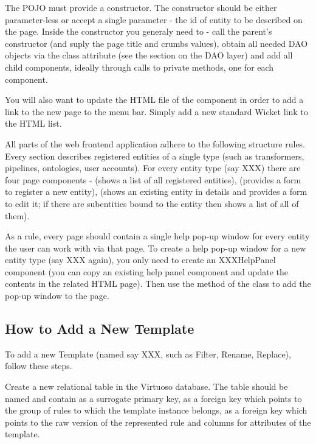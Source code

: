 \begin{description}[style=nextline,font=\ttfamily]
The POJO must provide a constructor. The constructor should be either parameter-less or accept a single parameter - the id of entity to be described on the page. Inside the constructor you generaly need to - call the parent's constructor (and suply the page title and crumbs values), obtain all needed DAO objects via the  class attribute (see the section on the DAO layer) and add all child components, ideally through calls to private methods, one for each component.

You will also want to update the HTML file of the  component in order to add a link to the new page to the menu bar. Simply add a new standard Wicket link to the HTML list.

All parts of the web frontend application adhere to the following structure rules. Every section describes registered entities of a single type (such as transformers, pipelines, ontologies, user accounts). For every entity type (say XXX) there are four page components -  (shows a list of all registered entities),  (provides a form to register a new entity),  (shows an existing entity in details and provides a form to edit it; if there are subentities bound to the entity then shows a list of all of them).

As a rule, every page should contain a single help pop-up window for every entity the user can work with via that page. To create a help pop-up window for a new entity type (say XXX again), you only need to create an XXXHelpPanel component (you can copy an existing help panel component and update the contents in the related HTML page). Then use the  method of the  class to add the pop-up window to the page.


\subsection{How to Add a New \DN Template}

To add a new \DN Template (named say XXX, such as Filter, Rename, Replace), follow these steps.

Create a new relational table in the Virtuoso database. The table should be named  and contain  as a surrogate primary key,  as a foreign key which points to the group of rules to which the template instance belongs,  as a foreign key which points to the raw version of the represented rule and columns for attributes of the template.


\end{description}
